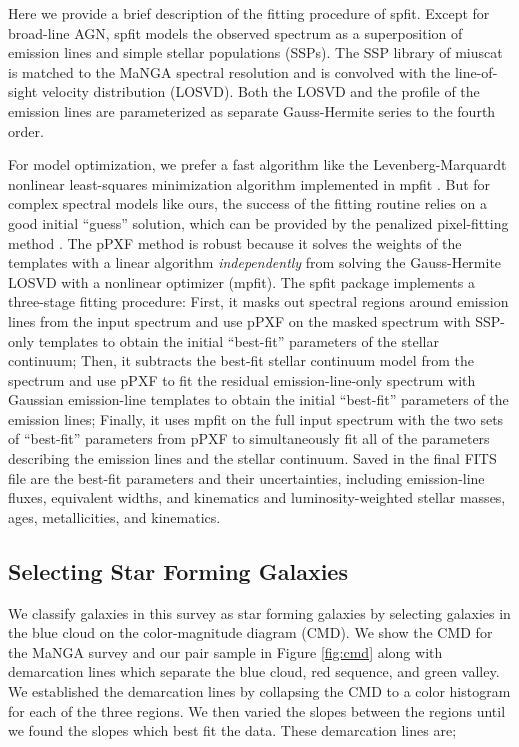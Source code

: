 \documentclass[apj,twocolumn]{emulateapj}
\begin{document}
\begin{CJK*}{UTF8}{gbsn}
Here we provide a brief description of the fitting procedure of {\sc spfit}. Except for broad-line AGN, {\sc spfit} models the observed spectrum as a superposition of emission lines and simple stellar populations (SSPs). The SSP library of {\sc miuscat} \citep{Vazdekis:2012} is matched to the MaNGA spectral resolution and is convolved with the line-of-sight velocity distribution (LOSVD). Both the LOSVD and the profile of the emission lines are parameterized as separate Gauss-Hermite series \citep{van-der-Marel:1993} to the fourth order.

For model optimization, we prefer a fast algorithm like the Levenberg-Marquardt nonlinear least-squares minimization algorithm implemented in {\sc mpfit} \citep{Markwardt:2009}. But for complex spectral models like ours, the success of the fitting routine relies on a good initial ``guess'' solution, which can be provided by the penalized pixel-fitting method \citep[pPXF;][]{Cappellari:2017}. The pPXF method is robust because it solves the weights of the templates with a linear algorithm \citep{Lawson:1974} {\it independently} from solving the Gauss-Hermite LOSVD with a nonlinear optimizer ({\sc mpfit}). The {\sc spfit} package implements a three-stage fitting procedure: First, it masks out spectral regions around emission lines from the input spectrum and use pPXF on the masked spectrum with SSP-only templates to obtain the initial ``best-fit'' parameters of the stellar continuum; Then, it subtracts the best-fit stellar continuum model from the spectrum and use pPXF to fit the residual emission-line-only spectrum with Gaussian emission-line templates to obtain the initial ``best-fit'' parameters of the emission lines; Finally, it uses {\sc mpfit} on the full input spectrum with the two sets of ``best-fit'' parameters from pPXF to simultaneously fit all of the parameters describing the emission lines and the stellar continuum. Saved in the final FITS file are the best-fit parameters and their uncertainties, including emission-line fluxes, equivalent widths, and kinematics and luminosity-weighted stellar masses, ages, metallicities, and kinematics. 

\subsection{Selecting Star Forming Galaxies}\label{sec:sf}

We classify galaxies in this survey as star forming galaxies by selecting galaxies in the blue cloud on the color-magnitude diagram (CMD). We show the CMD for the MaNGA survey and our pair sample in Figure \ref{fig:cmd} along with demarcation lines which separate the blue cloud, red sequence, and green valley. We established the demarcation lines by collapsing the CMD to a color histogram for each of the three regions. We then varied the slopes between the regions until we found the slopes which best fit the data. These demarcation lines are;


\end{CJK*}
\end{document}
